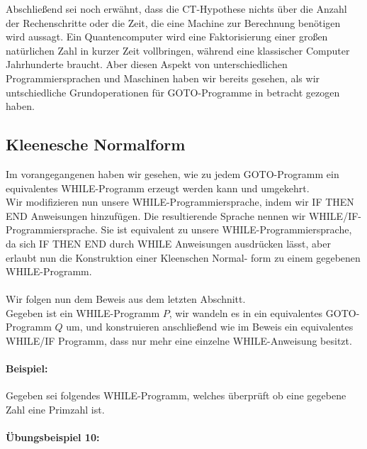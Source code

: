 \documentclass[11pt,a4paper,leqno]{report}
\numberwithin{equation}{chapter}
\begin{document}
Abschließend sei noch erwähnt, dass die CT-Hypothese nichts über die Anzahl der Rechenschritte oder die Zeit, die eine Machine zur Berechnung benötigen wird aussagt. Ein Quantencomputer wird eine Faktorisierung einer großen natürlichen Zahl in kurzer Zeit vollbringen, während eine klassischer Computer Jahrhunderte braucht. Aber diesen Aspekt von unterschiedlichen Programmiersprachen und Maschinen haben wir bereits gesehen, als wir untschiedliche Grundoperationen für GOTO-Programme in betracht gezogen haben.

\subsection{Kleenesche Normalform}
Im vorangegangenen haben wir gesehen, wie zu jedem GOTO-Programm ein equivalentes WHILE-Programm erzeugt werden kann und umgekehrt.\\
Wir modifizieren nun unsere WHILE-Programmiersprache, indem wir IF THEN END Anweisungen hinzufügen. Die resultierende Sprache nennen wir WHILE/IF-Programmiersprache. Sie ist equivalent zu unsere WHILE-Programmiersprache, da sich IF THEN END durch WHILE Anweisungen ausdrücken lässt, aber erlaubt nun die Konstruktion einer Kleenschen Normal- form zu einem gegebenen WHILE-Programm.\\
\\
Wir folgen nun dem Beweis aus dem letzten Abschnitt.\\
Gegeben ist ein WHILE-Programm $P$, wir wandeln es in ein equivalentes GOTO-Programm $Q$ um, und konstruieren anschließend wie im Beweis ein equivalentes WHILE/IF Programm, dass nur mehr eine einzelne WHILE-Anweisung besitzt. 
\paragraph{Beispiel:} Gegeben sei folgendes WHILE-Programm, welches überprüft ob eine gegebene Zahl eine Primzahl ist.
\paragraph{Übungsbeispiel 10:}
\newpage
\end{document}
